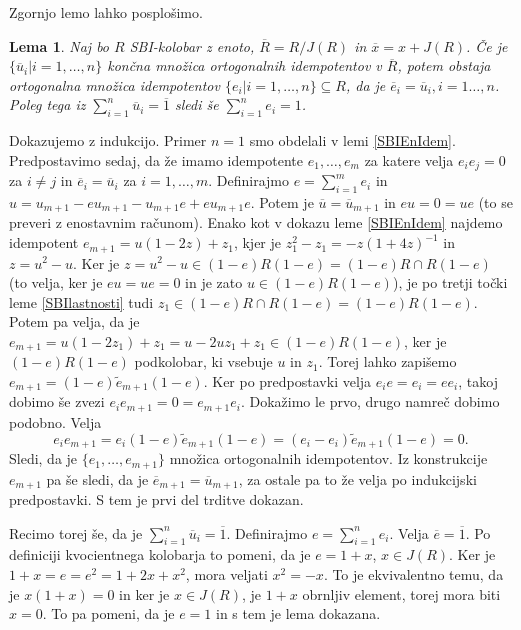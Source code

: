 \documentclass[a4paper, 12pt]{amsart}
\theoremstyle{definition} %
\theoremstyle{plain} %
\newtheorem{lema}[definicija]{Lema}
\begin{document}
Zgornjo lemo lahko posplošimo.

\begin{lema}
\label{SBInIdem}
Naj bo $R$ SBI-kolobar z enoto, $\overline{R} = R/J(R)$ in $\overline{x} = x + J(R)$. Če je $\{\overline{u}_i|i=1,\dots,n\}$ končna množica ortogonalnih idempotentov v $\overline{R}$, potem obstaja ortogonalna množica idempotentov $\{e_i|i=1,\dots,n\} \subseteq R$, da je $\overline{e}_i = \overline{u}_i, i =1\dots,n$. Poleg tega iz $\sum_{i=1}^n \overline{u}_i = \overline{1}$ sledi še $\sum_{i=1}^n e_i =1$. 
\end{lema}

\proof
Dokazujemo z indukcijo. Primer $n=1$ smo obdelali v lemi \ref{SBIEnIdem}. Predpostavimo sedaj, da že imamo idempotente $e_1,\dots,e_m$ za katere velja $e_i e_j = 0$ za $ i \neq j$ in $\overline{e}_i = \overline{u}_i$ za $i=1,\dots,m$. Definirajmo $e=\sum_{i=1}^m e_i$ in $u = u_{m+1} - eu_{m+1} - u_{m+1}e + eu_{m+1}e$. Potem je $\overline{u} = \overline{u}_{m+1}$ in $eu = 0 = ue$ (to se preveri z enostavnim računom). Enako kot v dokazu leme  \ref{SBIEnIdem} najdemo idempotent $e_{m+1} = u(1-2z) + z_1$, kjer je $z_1^2 - z_1 = -z(1+4z)^{-1}$ in $z = u^2 - u$. Ker je $z=u^2 - u\in (1-e) R(1-e) = (1-e)R\cap R(1-e)$ (to velja, ker je $eu=ue=0$ in je zato $u\in (1-e)R(1-e)$), je po tretji točki leme \ref{SBIlastnosti} tudi $z_1 \in (1-e) R\cap R(1-e) = (1-e)R(1-e)$. Potem pa velja, da je $e_{m+1} = u(1-2z_1) + z_1 = u - 2 uz_1 + z_1\in (1-e)R(1-e)$, ker je $(1-e)R(1-e)$ podkolobar, ki vsebuje $u$ in $z_1$. Torej lahko zapišemo $e_{m+1} = (1-e)\tilde{e}_{m+1}(1-e)$. Ker po predpostavki velja $e_i e =  e_i = e e_i$, takoj dobimo še zvezi $e_i e_{m+1} = 0 =e_{m+1} e_i$. Dokažimo le prvo, drugo namreč dobimo podobno. Velja
$$
e_i e_{m+1} = e_i (1-e) \tilde{e}_{m+1} (1-e) = (e_i - e_i) \tilde{e}_{m+1}(1-e) = 0.
$$
Sledi, da je $\{e_1, \dots, e_{m+1}\}$ množica ortogonalnih idempotentov. Iz konstrukcije $e_{m+1}$ pa še sledi, da je $\overline{e}_{m+1} =  \overline{u}_{m+1}$, za ostale pa to že velja po indukcijski predpostavki. S tem je prvi del trditve dokazan. 

Recimo torej še, da je $\sum_{i=1}^n \overline{u}_i = \overline{1}$. Definirajmo $e= \sum_{i=1}^n e_i$. Velja $\overline{e} = \overline{1}$. Po definiciji kvocientnega kolobarja to pomeni, da je $e = 1+x$, $x\in J(R)$. Ker je $1+x=e=e^2 = 1+ 2x + x^2$, mora veljati $x^2 = -x$. To je ekvivalentno temu, da je 
$x(1+x) = 0$ in ker je $x\in J(R)$, je $1+x$ obrnljiv element, torej mora biti $x=0$. To pa pomeni, da je $e=1$ in s tem je lema dokazana.
\endproof
\end{document}
